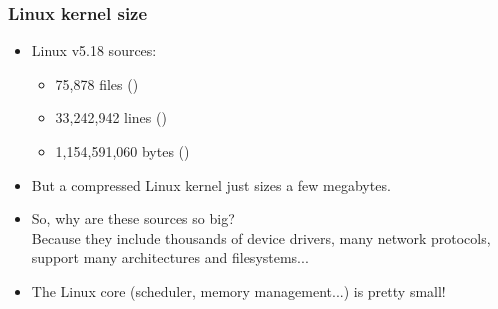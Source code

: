 \begin{frame}
  \frametitle{Linux kernel size}
  \begin{itemize}
  \item Linux v5.18 sources:\\
    \begin{itemize}
	\item 75,878 files ()
	\item 33,242,942 lines ()
	\item 1,154,591,060 bytes ()
    \end{itemize}
  \item But a compressed Linux kernel just sizes a few megabytes.
  \item So, why are these sources so big?\\
    Because they include thousands of device drivers, many network
    protocols, support many architectures and filesystems...
  \item The Linux core (scheduler, memory management...) is pretty
    small!
  \end{itemize}
\end{frame}

